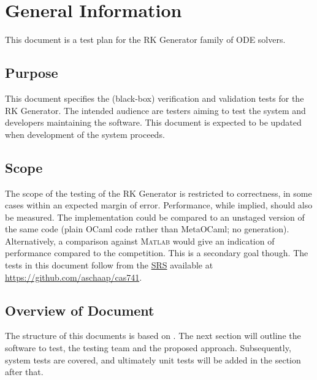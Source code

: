 \documentclass[12pt, titlepage]{article}
\begin{document}

\newpage



\section{General Information}

This document is a test plan for the RK Generator family of ODE solvers.

\subsection{Purpose}

This document specifies the (black-box) verification and validation tests for 
the RK Generator. The intended audience are testers aiming to test the system 
and developers maintaining the software. This document is expected to be 
updated when development of the system proceeds.

\subsection{Scope}

The scope of the testing of the RK Generator is restricted to correctness, in 
some cases within an expected margin of error. Performance, while implied, 
should also be measured. The implementation could be compared to an unstaged 
version of the same code (plain OCaml code rather than MetaOCaml; no 
generation). 
Alternatively, a comparison against \textsc{\textsc{Matlab}} would give an 
indication of 
performance compared to the competition. This is a secondary goal though.
The tests in this document follow from the \href{../SRS/CA.pdf}{SRS} available 
at \url{https://github.com/aschaap/cas741}.

\subsection{Overview of Document}
The structure of this documents is based on \cite{Smith2006}. The next section 
will outline the software to test, the testing team and the proposed approach.
Subsequently, system tests are covered, and ultimately unit tests will be added 
in the section after that. 
\end{document}
